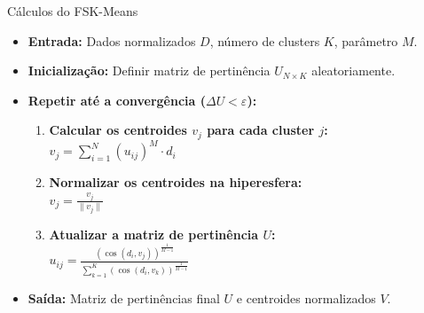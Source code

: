 \documentclass[aspectratio=43]{beamer}
\begin{document}
\begin{frame}[t]{Cálculos do FSK-Means}

\vspace{0.15cm}
\small
\begin{itemize}
    \item \textbf{Entrada:} Dados normalizados $D$, número de clusters $K$, parâmetro $M$.
    
    \item \textbf{Inicialização:} Definir matriz de pertinência $U_{N \times K}$ aleatoriamente.
    
    \item \textbf{Repetir até a convergência ($\Delta U < \varepsilon$):}
    \begin{enumerate}
        \item \textbf{Calcular os centroides $v_j$ para cada cluster $j$:} \\
        \quad $v_j = \sum_{i=1}^{N} (u_{ij})^M \cdot d_i$
        
        \vspace{0.05cm}
        \item \textbf{Normalizar os centroides na hiperesfera:} \\
        \quad $v_j = \frac{v_j}{\|v_j\|}$
        
        \vspace{0.05cm}
        \item \textbf{Atualizar a matriz de pertinência $U$:} \\
        \quad $\displaystyle u_{ij} = \frac{(\cos(d_i, v_j))^{\frac{1}{M-1}}}{\sum_{k=1}^{K} (\cos(d_i, v_k))^{\frac{1}{M-1}}}$
    \end{enumerate}
    
    \vspace{0.1cm}
    \item \textbf{Saída:} Matriz de pertinências final $U$ e centroides normalizados $V$.
\end{itemize}

\end{frame}
\end{document}
